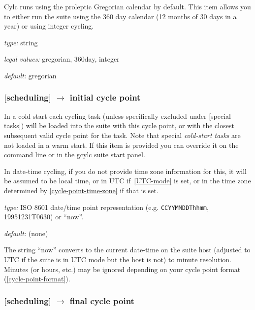 Cylc runs using the proleptic Gregorian calendar by default. This item allows
you to either run the suite using the 360 day calendar (12 months of 30 days 
in a year) or using integer cycling.

\begin{myitemize}
    \item {\em type:} string
    \item {\em legal values:} gregorian, 360day, integer
    \item {\em default:} gregorian
    
\end{myitemize}

\subsubsection[initial cycle point]{[scheduling] $\rightarrow$ initial cycle point}
\label{initial cycle point}

In a cold start each cycling task (unless specifically excluded under
[special tasks]) will be loaded into the suite with this cycle point,
or with the closest subsequent valid cycle point for the task. Note that
special {\em cold-start tasks} are not loaded in a warm start. If this item is
provided you can override it on the command line or in the gcylc suite start
panel.

In date-time cycling, if you do not provide time zone information for this,
it will be assumed to be local time, or in UTC if~\ref{UTC-mode} is set, or in
the time zone determined by \ref{cycle-point-time-zone} if that is set.

\begin{myitemize}
    \item {\em type:} ISO 8601 date/time point representation (e.g.
 \lstinline=CCYYMMDDThhmm=, 19951231T0630) or ``now''.
    \item {\em default:} (none)
\end{myitemize}

The string ``now'' converts to the current date-time on the suite host (adjusted
to UTC if the suite is in UTC mode but the host is not) to minute resolution.
Minutes (or hours, etc.) may be ignored depending on your cycle point format
(\ref{cycle-point-format}).

\subsubsection[final cycle point]{[scheduling] $\rightarrow$ final cycle point}

